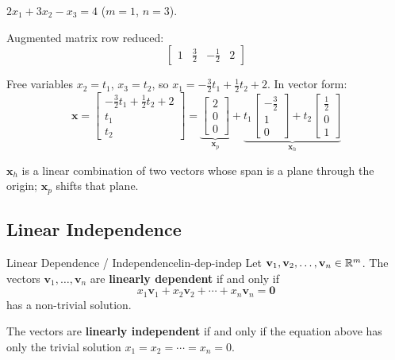\begin{example}
  $2x_1 + 3x_2 - x_3 = 4$ \quad ($m = 1$, $n = 3$).

  Augmented matrix row reduced:
  \[
    \left[
      \begin{array}{ccc|c}
        1 & \tfrac{3}{2} & -\tfrac{1}{2} & 2
      \end{array}
      \right]
  \]

  Free variables $x_2 = t_1$, $x_3 = t_2$, so $x_1 = -\tfrac{3}{2}t_1 + \tfrac{1}{2}t_2 + 2$. In vector form:
  \[
    \mathbf{x}
    =
    \begin{bmatrix}
      -\tfrac{3}{2}t_1 + \tfrac{1}{2}t_2 + 2 \\ t_1 \\ t_2
    \end{bmatrix}
    = \underbrace{
      \begin{bmatrix}
        2 \\ 0 \\ 0
      \end{bmatrix}
    }_{\mathbf{x}_p}
    + \underbrace{t_1
      \begin{bmatrix}
        -\tfrac{3}{2} \\ 1 \\ 0
      \end{bmatrix}
      + t_2
      \begin{bmatrix}
        \tfrac{1}{2} \\ 0 \\ 1
      \end{bmatrix}
    }_{\mathbf{x}_h}
  \]

  $\mathbf{x}_h$ is a linear combination of two vectors whose span is a plane through the origin; $\mathbf{x}_p$ shifts that plane.
\end{example}

\subsection{Linear Independence}

\begin{definition}{Linear Dependence / Independence}{lin-dep-indep}
  Let $\mathbf{v}_1, \mathbf{v}_2, \ldots, \mathbf{v}_n \in \mathbb{R}^m$. The vectors $\mathbf{v}_1, \ldots, \mathbf{v}_n$ are \textbf{linearly dependent} if and only if
  \[
    x_1 \mathbf{v}_1 + x_2 \mathbf{v}_2 + \cdots + x_n \mathbf{v}_n = \mathbf{0}
  \]
  has a non-trivial solution.

  The vectors are \textbf{linearly independent} if and only if the equation above has only the trivial solution $x_1 = x_2 = \cdots = x_n = 0$.
\end{definition}

